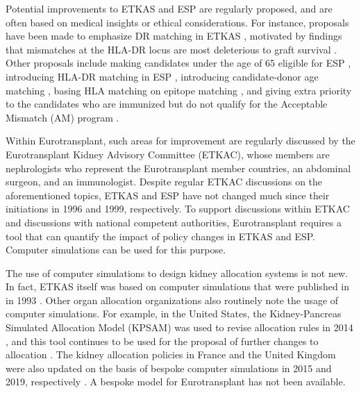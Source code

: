 \documentclass[11pt,twoside,]{book}
\begin{document}
Potential improvements to ETKAS and ESP are regularly proposed, and are
often based on medical insights or ethical considerations. For instance,
proposals have been made to emphasize DR matching in ETKAS
\citep{vereerstraetenAllocationCadaverKidneys1999, doxiadisSimplerEquitableAllocation2007},
motivated by findings that mismatches at the HLA-DR locus are most deleterious to graft
survival \citep{Roberts2004, johnsonFactorsInfluencingOutcome2010}.
Other proposals include making candidates under the age of 65 eligible for ESP
\citep{Ssal2020}, introducing HLA-DR matching in ESP \citep{deFijter2023}, introducing candidate-donor age matching
\citep{vonsamson-himmelstjernaContinuousDonorrecipientAge2024}, basing HLA matching on epitope
matching \citep{Niemann2021}, and giving extra priority to the candidates who
are immunized but do not qualify for the Acceptable Mismatch (AM) program
\citep{ziemannUnacceptableHumanLeucocyte2017, zecherImpactSensitizationWaiting2022a}.

Within Eurotransplant, such areas for improvement are regularly discussed
by the Eurotransplant Kidney Advisory Committee (ETKAC), whose members are
nephrologists who represent the Eurotransplant member countries,
an abdominal surgeon, and an immunologist. Despite regular ETKAC discussions
on the aforementioned topics, ETKAS and ESP have not changed much since their
initiations in 1996 and 1999, respectively. To support discussions within ETKAC
and discussions with national competent authorities, Eurotransplant requires a tool that can
quantify the impact of policy changes in ETKAS and ESP. Computer simulations
can be used for this purpose.

The use of computer simulations to design kidney allocation systems is not new.
In fact, ETKAS itself was based on computer simulations that were published in
in 1993 \citep{wujciakComputerAnalysisCadaver1993, wujciakProposalImprovedCadaver1993a}. Other organ allocation organizations also
routinely note the usage of computer simulations. For example, in the United States,
the Kidney-Pancreas Simulated Allocation Model (KPSAM) was used to revise allocation rules
in 2014 \citep{israniNewNationalAllocation2014}, and this tool continues to
be used for the proposal of further changes to allocation
\citep{israniNewKidneyPancreas2021, mankowskiAcceleratingKidneyAllocation2019}.
The kidney allocation policies in France and the United Kingdom were also
updated on the basis of bespoke computer simulations in 2015 and 2019,
respectively \citep{jacquelinetChangingKidneyAllocation2006, Audry2022, Mumford2018}.
A bespoke model for Eurotransplant has not been available.
\end{document}
